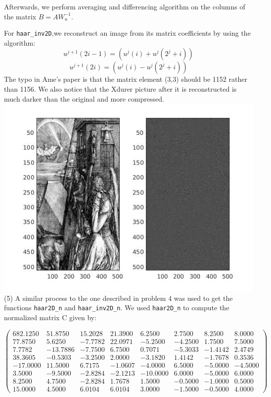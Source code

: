 \documentclass[12pt]{article}
\begin{document}
Afterwards, we perform averaging and differencing algorithm on the columns of the matrix $B=A W_n^{-1}$.

For {\tt haar\_inv2D},we reconstruct an image from its matrix coefficients by using the algorithm: 
$$u^{j+1}(2i-1) = (u^{j}(i) + u^{j}(2^j+i))$$  
$$u^{j+1}(2i) = (u^{j}(i) - u^{j}(2^j+i))$$
The typo in Ame's paper is that the matrix element 
(3,3) should be 1152 rather than 1156. We also notice that the Xdurer picture after it is reconstructed is much darker than the original and more compressed.\\
\includegraphics[scale=0.6]{Problem4_origin_vs_haar}
\medskip\\
(5)
A similar process to the one described in problem 4 was used to get the functions {\tt haar2D\_n} and {\tt haar\_inv2D\_n}.
We used {\tt haar2D\_n} to compute the normalized matrix C given by:

$$\begin{pmatrix}
682.1250 &  51.8750 &  15.2028 &  21.3900&    6.2500 &   2.7500 &   8.2500 &   8.0000\\
   77.8750   & 5.6250 &  -7.7782 &  22.0971 &  -5.2500  & -4.2500 &   1.7500 &   7.5000\\
    7.7782 & -13.7886 &  -7.7500  &  6.7500 &   0.7071 &  -5.3033 &  -1.4142 &   2.4749\\
  38.3605 &  -0.5303 &  -3.2500 &   2.0000   &-3.1820   & 1.4142  & -1.7678 &   0.3536\\
  -17.0000 &  11.5000 &   6.7175 &  -1.0607&   -4.0000  &  6.5000  & -5.0000 &  -4.5000\\
    3.5000&   -9.5000  & -2.8284 &  -2.1213&  -10.0000 &   6.0000&   -5.0000&    6.0000\\
    8.2500   & 4.7500 &  -2.8284  &  1.7678    &1.5000  & -0.5000 &  -1.0000   & 0.5000\\
   15.0000 &   4.5000 &   6.0104 &   6.0104    &3.0000  & -1.5000 &  -0.5000  &  4.0000
   \end{pmatrix}$$
   
\end{document}
